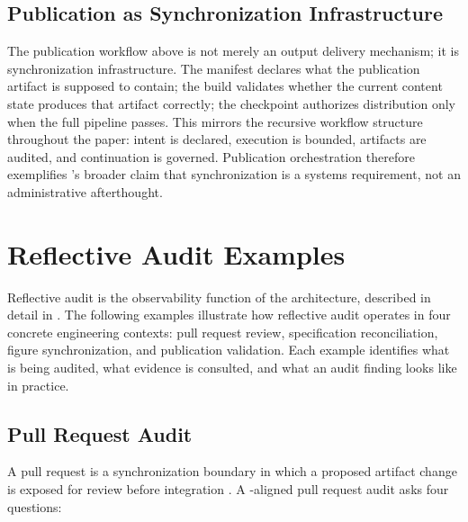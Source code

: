 \subsection{Publication as Synchronization Infrastructure}

The publication workflow above is not merely an output delivery mechanism; it is synchronization infrastructure. The manifest declares what the publication artifact is supposed to contain; the build validates whether the current content state produces that artifact correctly; the checkpoint authorizes distribution only when the full pipeline passes. This mirrors the recursive workflow structure throughout the paper: intent is declared, execution is bounded, artifacts are audited, and continuation is governed. Publication orchestration therefore exemplifies 's broader claim that synchronization is a systems requirement, not an administrative afterthought.


\section{Reflective Audit Examples}
\label{sec:appendix-audit}

Reflective audit is the observability function of the  architecture, described in detail in . The following examples illustrate how reflective audit operates in four concrete engineering contexts: pull request review, specification reconciliation, figure synchronization, and publication validation. Each example identifies what is being audited, what evidence is consulted, and what an audit finding looks like in practice.

\subsection{Pull Request Audit}

A pull request is a synchronization boundary in which a proposed artifact change is exposed for review before integration \cite{Jimenez2024SWEBench}. A -aligned pull request audit asks four questions:

